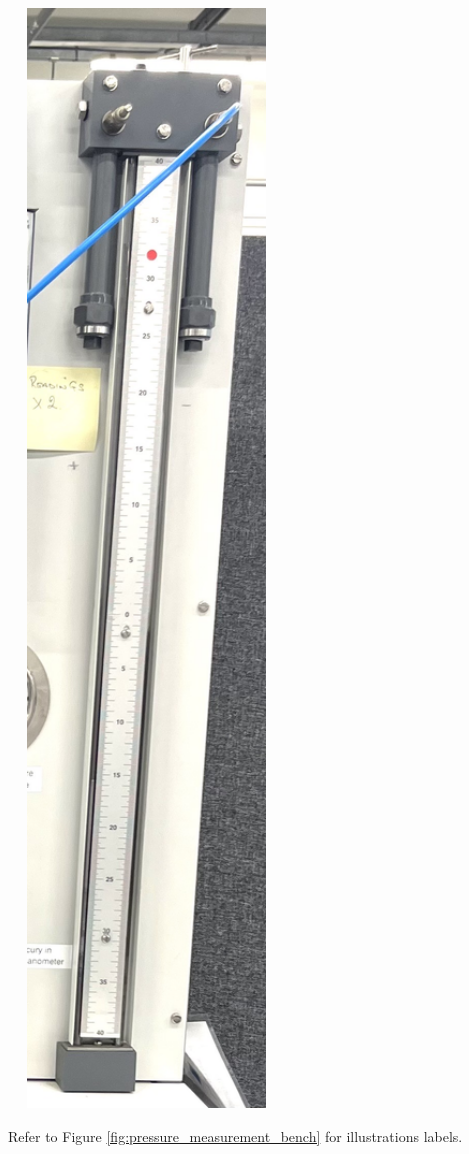 \documentclass{article}
\begin{document}
\begin{minipage}{0.45\textwidth}
\begin{minipage}{1\textwidth}
\begin{minipage}{0.45\textwidth}
			\end{minipage}\hspace{0.5em}
			\begin{minipage}{0.4\textwidth}\centering
				\includegraphics[width=0.55\textwidth]{images/Image(2).jpg}
			\end{minipage}
			\end{minipage}
			
			\centering
			\small Refer to Figure \ref{fig:pressure_measurement_bench} for illustrations labels.
	\end{minipage}
\end{document}
